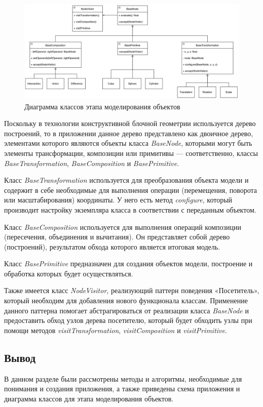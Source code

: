 \begin{figure}[h]
	\centering
	\captionsetup{justification=centering}
	\includegraphics[width=160mm]{img/modeling.png}
	\caption{Диаграмма классов этапа моделирования объектов}
	\label{fig:modeling}
\end{figure}
\clearpage

Поскольку  в  технологии  конструктивной  блочной  геометрии 
используется дерево построений, то в приложении данное дерево представлено 
как двоичное дерево, элементами которого являются объекты класса \textit{BaseNode}, которыми могут быть элементы трансформации, композиции или примитивы --- соответственно, классы \textit{BaseTransformation}, \textit{BaseComposition} и \textit{BasePrimitive}.

Класс  \textit{BaseTransformation} используется  для  преобразования  объекта 
модели  и  содержит  в  себе  необходимые  для  выполнения  операции 
(перемещения, поворота или масштабирования) координаты.
У него есть метод \textit{configure}, который производит настройку экземпляра класса в соответствии с переданным объектом.

Класс  \textit{BaseComposition} используется  для  выполнения  операций композиции (пересечения, объединения и вычитания).
Он представляет собой дерево (построений), результатом обхода которого является итоговая модель.

Класс  \textit{BasePrimitive}  предназначен  для  создания  объектов  модели, 
построение и обработка которых будет осуществляться.

Также  имеется  класс  \textit{NodeVisitor},  реализующий  паттерн  поведения 
«Посетитель», который необходим для добавления нового функционала классам.
Применение данного паттерна помогает абстрагироваться от реализации класса 
\textit{BaseNode} и  предоставить  обход  узлов  дерева  посетителю,  который  будет обходить  узлы  при  помощи  методов  \textit{visitTransformation}, \textit{visitComposition} и \newline \textit{visitPrimitive}.

\subsection*{Вывод}

В данном разделе были рассмотрены методы и алгоритмы, необходимые 
для понимания и создания приложения, а также приведены схема приложения и 
диаграмма классов для этапа моделирования объектов.
\pagebreak